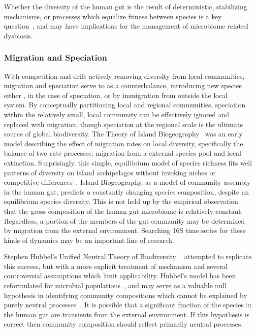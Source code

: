 \documentclass[12pt]{article}
\begin{document}
Whether the diversity of the human gut is the result of
deterministic, stabilizing mechanisms, or processes which equalize
fitness between species is a key question~\citep{Adler2007},
and may have implications for the management of microbiome related
dysbiosis.

\subsubsection{Migration and Speciation}
With competition and drift actively removing diversity from local
communities, migration and speciation serve to as a counterbalance,
introducing new species either ,
in the case of speciation, or by immigration from outside the
local system.
By conceptually partitioning local and regional communities,
speciation within the relatively small, local community can be effectively
ignored and replaced with migration,
though speciation at the regional scale is the ultimate source of global
biodiversity.
The Theory of Island Biogeography~\citep{macarthur1967b} was
an early model describing the effect of migration rates on local diversity,
specifically the balance of two rate processes:
migration from a external species pool and local extinction.
Surprisingly, this simple, equilibrium model of species richness
fits well patterns of diversity on island archipelagos
without invoking niches or competitive differences~\citep{Simberloff1976}.
Island Biogeography, as a model of community assembly in the human gut,
predicts a constantly changing species composition,
despite an equilibrium species diversity.
This is not held up by the empirical observation that the gross composition of
the human gut microbiome is relatively constant.
Regardless, a portion of the members of the gut community may be determined
by migration from the external environment.
Searching 16S time series for these kinds of dynamics may be an important
line of research.

Stephen Hubbel's Unified Neutral Theory of Biodiversity%
~\citeyearpar{Hubbell2001}
attempted to replicate this success,
but with a more explicit treatment of mechanism
and several controversial assumptions which limit applicability.
Hubbel's model has been
reformulated for microbial populations~\citep{Sloan2005},
and may serve as a valuable null hypothesis in identifying community
compositions which cannot be explained
by purely neutral processes~\citep{VenkataramenTODO}.
It is possible that
a significant fraction of the species in the human gut are
transients from the external environment.
If this hypothesis is correct then community composition should reflect
primarily neutral processes.
\end{document}
